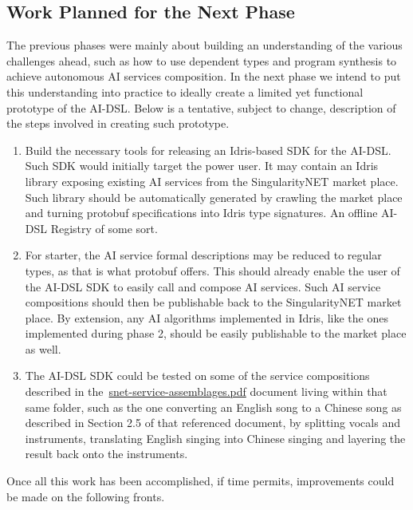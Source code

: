 \documentclass[]{report}
\begin{document}
\subsection{Work Planned for the Next Phase}

The previous phases were mainly about building an understanding of the
various challenges ahead, such as how to use dependent types and
program synthesis to achieve autonomous AI services composition.  In
the next phase we intend to put this understanding into practice to
ideally create a limited yet functional prototype of the AI-DSL.
Below is a tentative, subject to change, description of the steps
involved in creating such prototype.

\begin{enumerate}
\item Build the necessary tools for releasing an Idris-based SDK for
  the AI-DSL.  Such SDK would initially target the power user.  It may
  contain an Idris library exposing existing AI services from the
  SingularityNET market place.  Such library should be automatically
  generated by crawling the market place and turning protobuf
  specifications into Idris type signatures.  An offline AI-DSL
  Registry of some sort.
\item For starter, the AI service formal descriptions may be reduced
  to regular types, as that is what protobuf offers.  This should
  already enable the user of the AI-DSL SDK to easily call and compose
  AI services.  Such AI service compositions should then be
  publishable back to the SingularityNET market place.  By extension,
  any AI algorithms implemented in Idris, like the ones implemented
  during phase 2, should be easily publishable to the market place as
  well.
\item The AI-DSL SDK could be tested on some of the service
  compositions described in
  the~\href{https://github.com/singnet/ai-dsl/blob/master/doc/technical-reports/2022-Oct/snet-service-assemblages.pdf}{snet-service-assemblages.pdf}
  document living within that same folder, such as the one converting
  an English song to a Chinese song as described in Section 2.5 of
  that referenced document, by splitting vocals and instruments,
  translating English singing into Chinese singing and layering the
  result back onto the instruments.
\end{enumerate}
Once all this work has been accomplished, if time permits,
improvements could be made on the following fronts.
\end{document}
